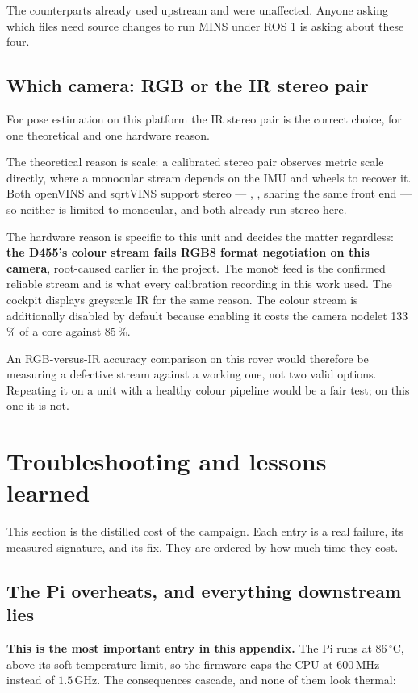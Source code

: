 \noindent The  counterparts already used  upstream and
were unaffected. Anyone asking which files need source changes to run MINS
under ROS 1 is asking about these four.

\subsection{Which camera: RGB or the IR stereo pair}

For pose estimation on this platform the IR stereo pair is the correct choice,
for one theoretical and one hardware reason.

\noindent The theoretical reason is scale: a calibrated stereo pair observes
metric scale directly, where a monocular stream depends on the IMU and wheels
to recover it. Both openVINS and sqrtVINS support stereo --- , , sharing the same  front end --- so
neither is limited to monocular, and both already run stereo here.

\noindent The hardware reason is specific to this unit and decides the matter
regardless: \textbf{the D455's colour stream fails RGB8 format negotiation on
this camera}, root-caused earlier in the project. The  mono8 feed
is the confirmed reliable stream and is what every calibration recording in
this work used. The cockpit displays greyscale IR for the same reason. The
colour stream is additionally disabled by default because enabling it costs the
camera nodelet 133\,\% of a core against 85\,\%.

\noindent An RGB-versus-IR accuracy comparison on this rover would therefore be
measuring a defective stream against a working one, not two valid options.
Repeating it on a unit with a healthy colour pipeline would be a fair test; on
this one it is not.



\section{Troubleshooting and lessons learned}
\label{ap:repro-trouble}
This section is the distilled cost of the campaign. Each entry is a real
failure, its measured signature, and its fix. They are ordered by how much
time they cost.

\subsection{The Pi overheats, and everything downstream lies}
\label{ap:repro-thermal}
\textbf{This is the most important entry in this appendix.} The Pi runs at
$86\,^\circ$C, above its soft temperature limit, so the firmware caps the CPU
at $600$\,MHz instead of $1.5$\,GHz. The consequences cascade, and none of
them look thermal:

